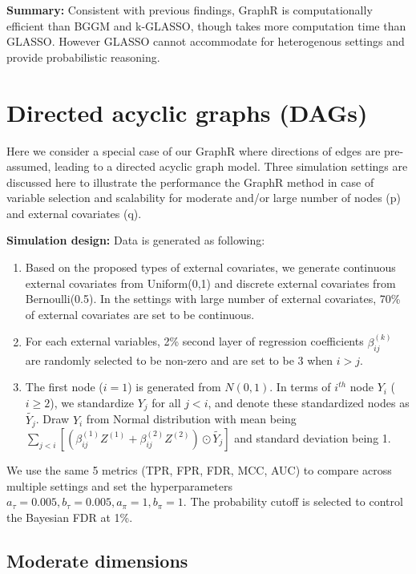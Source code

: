 \documentclass[
]{book}
\begin{document}
\textbf{Summary:} Consistent with previous findings, GraphR is computationally efficient than BGGM and k-GLASSO, though takes more computation time than GLASSO. However GLASSO cannot accommodate for heterogenous settings and provide probabilistic reasoning.

\hypertarget{dir}{%
\section{Directed acyclic graphs (DAGs)}\label{dir}}

Here we consider a special case of our GraphR where directions of edges are pre-assumed, leading to a directed acyclic graph model. Three simulation settings are discussed here to illustrate the performance the GraphR method in case of variable selection and scalability for moderate and/or large number of nodes (p) and external covariates (q).

\textbf{Simulation design:}
Data is generated as following:

\begin{enumerate}
\def\labelenumi{(\arabic{enumi})}
\item
  Based on the proposed types of external covariates, we generate continuous external covariates from Uniform(0,1) and discrete external covariates from Bernoulli(0.5). In the settings with large number of external covariates, 70\% of external covariates are set to be continuous.
\item
  For each external variables, 2\% second layer of regression coefficients \(\beta_{ij}^{(k)}\) are randomly selected to be non-zero and are set to be 3 when \(i > j\).
\item
  The first node (\(i=1\)) is generated from \(N(0,1)\). In terms of \(i^{th}\) node \(Y_i\) (\(i \geq 2\)), we standardize \(Y_j\) for all \(j < i\), and denote these standardized nodes as \(\tilde{Y_j}\). Draw \(Y_i\) from Normal distribution with mean being \(\sum_{j<i}\left[(\beta_{ij}^{(1)}Z^{(1)} + \beta_{ij}^{(2)}Z^{(2)}) \odot \tilde{Y_j} \right]\) and standard deviation being 1.
\end{enumerate}

We use the same 5 metrics (TPR, FPR, FDR, MCC, AUC) to compare across multiple settings and set the hyperparameters \(a_\tau = 0.005, b_\tau = 0.005, a_\pi = 1, b_\pi =1\). The probability cutoff is selected to control the Bayesian FDR at 1\%.

\hypertarget{moderate}{%
\subsection{Moderate dimensions}\label{moderate}}
\end{document}

